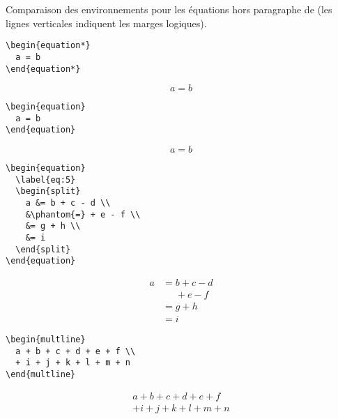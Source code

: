 \begin{table}[p]
  \caption{Comparaison des environnements pour les équations hors
    paragraphe de  (les lignes verticales indiquent les
    marges logiques).}
  \label{tab:math:displays}
  \renewcommand{\theequation}{\arabic{equation}}
  \begin{eqxample}
\begin{lstlisting}
\begin{equation*}
  a = b
\end{equation*}
\end{lstlisting}
    \producing
    \begin{equation*}
      a = b
    \end{equation*}
  \end{eqxample}

  \begin{eqxample}
\begin{lstlisting}
\begin{equation}
  a = b
\end{equation}
\end{lstlisting}
    \producing
    \begin{equation}
      a = b
    \end{equation}
  \end{eqxample}

  \begin{eqxample}
\begin{lstlisting}
\begin{equation}
  \label{eq:5}
  \begin{split}
    a &= b + c - d \\
    &\phantom{=} + e - f \\
    &= g + h \\
    &= i
  \end{split}
\end{equation}
\end{lstlisting}
    \producing
    \begin{equation}\label{eq:math:5}
      \begin{split}
        a& =b+c-d\\
        &\phantom{=} +e-f\\
        & =g+h\\
        & =i
      \end{split}
    \end{equation}
  \end{eqxample}

  \begin{eqxample}
\begin{lstlisting}
\begin{multline}
  a + b + c + d + e + f \\
  + i + j + k + l + m + n
\end{multline}
\end{lstlisting}
    \producing
    \begin{multline}
      a+b+c+d+e+f\\
      +i+j+k+l+m+n
    \end{multline}
  \end{eqxample}


\end{table}
